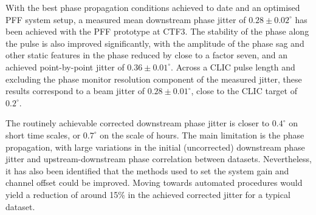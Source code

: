 
With the best phase propagation conditions achieved to date and an optimised PFF system setup, a measured mean downstream phase jitter of \(0.28\pm0.02^\circ\) has been achieved with the PFF prototype at CTF3. The stability of the phase along the pulse is also improved significantly, with the amplitude of the phase sag and other static features in the phase reduced by close to a factor seven, and an achieved point-by-point jitter of \(0.36\pm0.01^\circ\). Across a CLIC pulse length and excluding the phase monitor resolution component of the measured jitter, these results correspond to a beam jitter of \(0.28\pm0.01^\circ\), close to the CLIC target of \(0.2^\circ\).

The routinely achievable corrected downstream phase jitter is closer to \(0.4^\circ\) on short time scales, or \(0.7^\circ\) on the scale of hours. The main limitation is the phase propagation, with large variations in the initial (uncorrected) downstream phase jitter and upstream-downstream phase correlation between datasets. Nevertheless, it has also been identified that the methods used to set the system gain and channel offset could be improved. Moving towards automated procedures would yield a reduction of around 15\% in the achieved corrected jitter for a typical dataset. 
